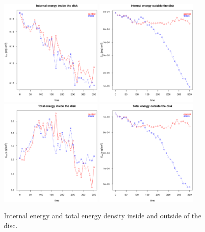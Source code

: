 \documentclass[a4paper,12pt]{article}
\begin{document}
\begin{figure}[!ht]
 \begin{center}
  \includegraphics[width=0.45\textwidth]{figs/enint_vs_t_disco.eps}
  \includegraphics[width=0.45\textwidth]{figs/enint_vs_t_outside.eps}
  \includegraphics[width=0.45\textwidth]{figs/entot_vs_t_disco.eps}
  \includegraphics[width=0.45\textwidth]{figs/entot_vs_t_outside.eps}

  \caption{Internal energy and total energy density inside and outside of the disc.}

\label{eninttot}
 \end{center}
\end{figure}
\end{document}
